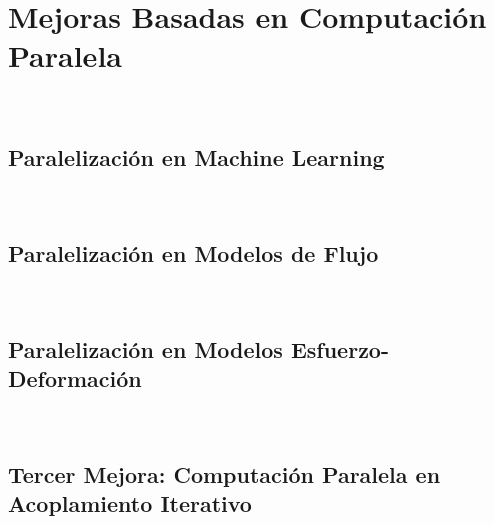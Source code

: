 %





\chapter{Mejoras Basadas en Computación Paralela}~\hypertarget{ch:chapter_08}{}
\label{ch:chapter_08}

\lipsum[1-2]

\section{Paralelización en Machine Learning}~\hypertarget{sec:sec810}{}
\label{sec:sec810}



\section{Paralelización en Modelos de Flujo}~\hypertarget{sec:sec820}{}
\label{sec:sec820}



\section{Paralelización en Modelos Esfuerzo-Deformación}~\hypertarget{sec:sec830}{}
\label{sec:sec830}



\section{Tercer Mejora: Computación Paralela en Acoplamiento Iterativo}~\hypertarget{sec:sec840}{}
\label{sec:sec840}


